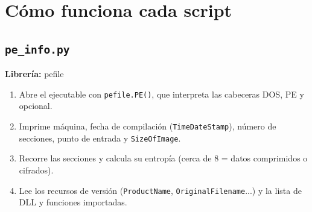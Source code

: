 \documentclass[11pt,a4paper]{article}
\begin{document}
\appendix
\clearpage
\section{Cómo funciona cada script}\label{ap:scripts}

\subsection{\texttt{pe\_info.py}}
\textbf{Librería:} pefile
\begin{enumerate}

\item Abre el ejecutable con \texttt{pefile.PE()}, que interpreta las cabeceras DOS, PE y opcional.

\item Imprime máquina, fecha de compilación (\texttt{TimeDateStamp}), número de secciones, punto de entrada y \texttt{SizeOfImage}.

\item Recorre las secciones y calcula su entropía (cerca de 8 = datos comprimidos o cifrados).

\item Lee los recursos de versión (\texttt{ProductName}, \texttt{OriginalFilename}...) y la lista de DLL y funciones importadas.

\end{enumerate}
\end{document}
